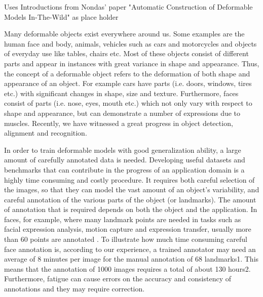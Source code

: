 Uses Introductions from Nondas' paper "Automatic Construction of Deformable Models In-The-Wild" as place holder

Many deformable objects exist everywhere around us.
Some examples are the human face and body, animals, vehicles
such as cars and motorcycles and objects of everyday
use like tables, chairs etc. Most of these objects consist of
different parts and appear in instances with great variance
in shape and appearance. Thus, the concept of a deformable
object refers to the deformation of both shape and appearance
of an object. For example cars have parts (i.e. doors,
windows, tires etc.) with significant changes in shape, size
and texture. Furthermore, faces consist of parts (i.e. nose,
eyes, mouth etc.) which not only vary with respect to shape
and appearance, but can demonstrate a number of expressions
due to muscles. Recently, we have witnessed a great
progress in object detection, alignment and recognition.

In order to train deformable models with good generalization
ability, a large amount of carefully annotated data
is needed. Developing useful datasets and benchmarks that
can contribute in the progress of an application domain is
a highly time consuming and costly procedure. It requires
both careful selection of the images, so that they can model
the vast amount of an object’s variability, and careful annotation
of the various parts of the object (or landmarks).
The amount of annotation that is required depends on both
the object and the application. In faces, for example, where
many landmark points are needed in tasks such as facial expression
analysis, motion capture and expression transfer,
usually more than 60 points are annotated \cite{?}.
To illustrate how much time consuming careful face annotation
is, according to our experience, a trained annotator
may need an average of 8 minutes per image for the manual
annotation of 68 landmarks1. This means that the annotation
of 1000 images requires a total of about 130 hours2.
Furthermore, fatigue can cause errors on the accuracy and
consistency of annotations and they may require correction.

